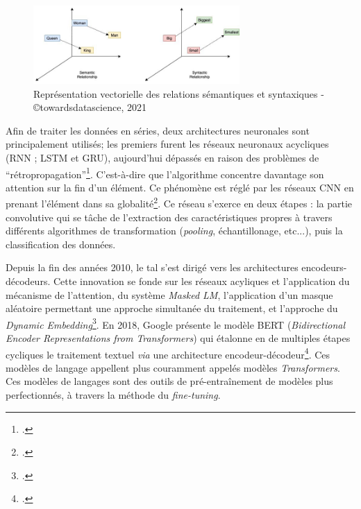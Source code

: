 	\begin{figure}[h!]
	    \centering
	    \includegraphics[width = 0.7\textwidth]{annexes/img/word_embedding.jpeg}
	    \caption{Représentation vectorielle des relations sémantiques et syntaxiques - \copyright towardsdatascience, 2021}
	    \label{fig:word_embedding}
	\end{figure}
	
	Afin de traiter les données en séries, deux architectures neuronales sont principalement utilisés; les premiers furent les réseaux neuronaux acycliques (RNN ; LSTM et GRU), aujourd'hui dépassés en raison des problèmes de \enquote{rétropropagation}\footcite[p.~161]{clericeDetectionIsotopiesPar2022}. C'est-à-dire que l'algorithme concentre davantage son attention sur la fin d'un élément. Ce phénomène est réglé par les réseaux \gls{CNN} en prenant l'élément dans sa globalité\footcite[p.~164]{clericeDetectionIsotopiesPar2022}. Ce réseau s'exerce en deux étapes : la partie convolutive qui se tâche de l'extraction des caractéristiques propres à travers différents algorithmes de transformation (\textit{pooling}, échantillonage, etc...), puis la classification des données.
	
	Depuis la fin des années 2010, le \gls{tal} s'est dirigé vers les architectures encodeurs-décodeurs. Cette innovation se fonde sur les réseaux acyliques et l'application du mécanisme de l'attention, du système \textit{Masked LM}, l'application d'un masque aléatoire permettant une approche simultanée du traitement, et l'approche du \textit{Dynamic Embedding}\footcite{vaswaniAttentionAllYou2017}. En 2018, Google présente le modèle BERT (\textit{Bidirectional Encoder Representations from Transformers}) qui étalonne en de multiples étapes cycliques le traitement textuel \textit{via} une architecture encodeur-décodeur\footcite{devlinBERTPretrainingDeep2019a}. Ces modèles de langage appellent plus couramment appelés modèles \textit{Transformers}. Ces modèles de langages sont des outils de pré-entraînement de modèles plus perfectionnés, à travers la méthode du \textit{fine-tuning}.
	
